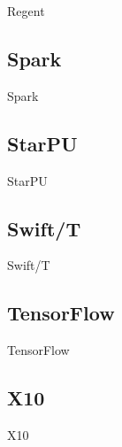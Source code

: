 Regent~\cite{Regent15}

\subsection{Spark}

Spark~\cite{Spark10}

\subsection{StarPU}

StarPU~\cite{StarPU11}

\subsection{Swift/T}

Swift/T~\cite{Wozniak13}

\subsection{TensorFlow}

TensorFlow~\cite{TensorFlow15}

\subsection{X10}

X10~\cite{X1005}
